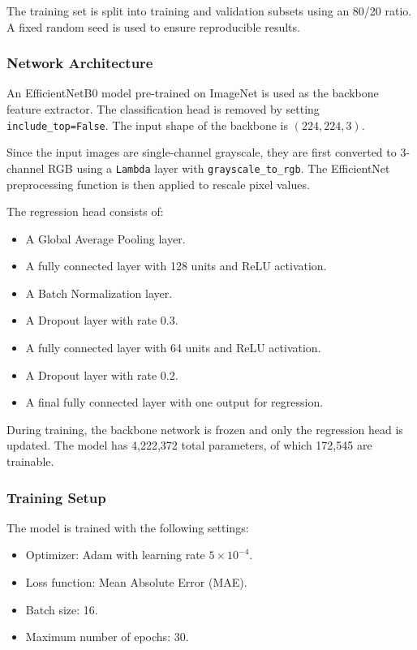 \documentclass[conference]{IEEEtran}
\begin{document}
The training set is split into training and validation subsets using an 80/20 ratio. A fixed random seed is used to ensure reproducible results.

\subsubsection{Network Architecture}

An EfficientNetB0 model pre-trained on ImageNet is used as the backbone feature extractor. The classification head is removed by setting \texttt{include\_top=False}. The input shape of the backbone is $(224, 224, 3)$.

Since the input images are single-channel grayscale, they are first converted to 3-channel RGB using a \texttt{Lambda} layer with \texttt{grayscale\_to\_rgb}. The EfficientNet preprocessing function is then applied to rescale pixel values.

The regression head consists of:
\begin{itemize}
    \item A Global Average Pooling layer.
    \item A fully connected layer with 128 units and ReLU activation.
    \item A Batch Normalization layer.
    \item A Dropout layer with rate 0.3.
    \item A fully connected layer with 64 units and ReLU activation.
    \item A Dropout layer with rate 0.2.
    \item A final fully connected layer with one output for regression.
\end{itemize}

During training, the backbone network is frozen and only the regression head is updated. The model has 4,222,372 total parameters, of which 172,545 are trainable.

\subsubsection{Training Setup}

The model is trained with the following settings:
\begin{itemize}
    \item Optimizer: Adam with learning rate $5 \times 10^{-4}$.
    \item Loss function: Mean Absolute Error (MAE).
    \item Batch size: 16.
    \item Maximum number of epochs: 30.
\end{itemize}
\end{document}
